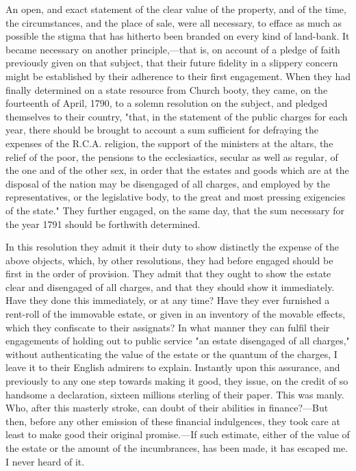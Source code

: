 An open, and exact statement of the clear value of the property, and of the time, the circumstances, and the place of sale, were all necessary, to efface as much as possible the stigma that has hitherto been branded on every kind of land-bank. It became necessary on another principle,—that is, on account of a pledge of faith previously given on that subject, that their future fidelity in a slippery concern might be established by their adherence to their first engagement. When they had finally determined on a state resource from Church booty, they came, on the fourteenth of April, 1790, to a solemn resolution on the subject, and pledged themselves to their country, "that, in the statement of the public charges for each year, there should be brought to account a sum sufficient for defraying the expenses of the R.C.A. religion, the support of the ministers at the altars, the relief of the poor, the pensions to the ecclesiastics, secular as well as regular, of the one and of the other sex, in order that the estates and goods which are at the disposal of the nation may be disengaged of all charges, and employed by the representatives, or the legislative body, to the great and most pressing exigencies of the state." They further engaged, on the same day, that the sum necessary for the year 1791 should be forthwith determined.

In this resolution they admit it their duty to show distinctly the expense of the above objects, which, by other resolutions, they had before engaged should be first in the order of provision. They admit that they ought to show the estate clear and disengaged of all charges, and that they should show it immediately. Have they done this immediately, or at any time? Have they ever furnished a rent-roll of the immovable estate, or given in an inventory of the movable effects, which they confiscate to their assignats? In what manner they can fulfil their engagements of holding out to public service "an estate disengaged of all charges," without authenticating the value of the estate or the quantum of the charges, I leave it to their English admirers to explain. Instantly upon this assurance, and previously to any one step towards making it good, they issue, on the credit of so handsome a declaration, sixteen millions sterling of their paper. This was manly. Who, after this masterly stroke, can doubt of their abilities in finance?—But then, before any other emission of these financial indulgences, they took care at least to make good their original promise.—If such estimate, either of the value of the estate or the amount of the incumbrances, has been made, it has escaped me. I never heard of it.


